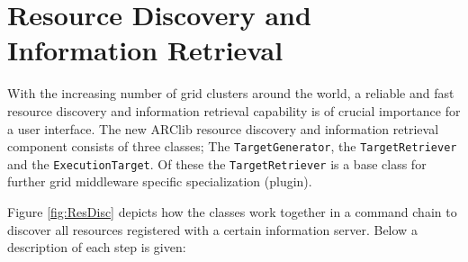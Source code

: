 \documentclass{book}
\newcommand{\TargetGenerator}{\texttt{TargetGenerator}}
\newcommand{\TargetRetriever}{\texttt{TargetRetriever}}
\newcommand{\ExecutionTarget}{\texttt{ExecutionTarget}}
\begin{document}
\section{Resource Discovery and Information Retrieval}
\label{sec:TargetDiscovery}
With the increasing number of grid clusters around the world, a reliable and fast resource discovery and 
information retrieval capability is of crucial importance for a user interface. The new ARClib resource 
discovery and information retrieval component consists of three classes; The {\TargetGenerator}, the 
{\TargetRetriever} and the {\ExecutionTarget}. Of these the {\TargetRetriever} is a base class for further grid 
middleware specific specialization (plugin).

Figure \ref{fig:ResDisc} depicts how the classes work together in a command chain to discover all resources 
registered with a certain information server. Below a description of each step is given:

\begin{figure}[ht]
\end{figure}
\end{document}
